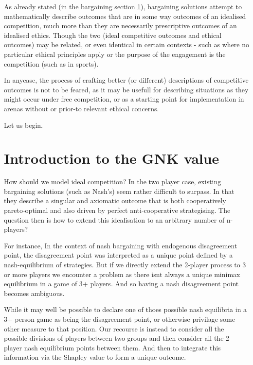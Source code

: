 As already stated (in the bargaining section \ref{}), bargaining solutions attempt to mathematically describe outcomes that are in some way outcomes of an idealised competition, much more than they are necessarily prescriptive outcomes of an idealised ethics.
Though the two (ideal competitive outcomes and ethical outcomes) may be related, or even identical in certain contexts - such as where no particular ethical principles apply or the purpose of the engagement is the competition (such as in sports).

In anycase, the process of crafting better (or different) descriptions of competitive outcomes is not to be feared, as it may be usefull for describing situations as they might occur under free competition, or as a starting point for implementation in arenas without or prior-to relevant ethical concerns.

Let us begin.

\section{Introduction to the GNK value}

How should we model ideal competition? In the two player case, existing bargaining solutions (such as Nash's) seem rather difficult to surpass. In that they describe a singular and axiomatic outcome that is both cooperatively pareto-optimal and also driven by perfect anti-cooperative strategising.
The question then is how to extend this idealisation to an arbitrary number of n-players?

For instance, In the context of nash bargaining with endogenous disagreement point, the disagreement point was interpreted as a unique point defined by a nash-equilibrium of strategies.
But if we directly extend the 2-player process to 3 or more players we encounter a problem as there isnt always a unique minimax equilibrium in a game of 3+ players.
And so having a nash disagreement point becomes ambiguous.

While it may well be possible to declare one of thoes possible nash equilibria in a 3+ person game as being the disagreement point, or otherwise privilage some other measure to that position.
Our recourse is instead to consider all the possible divisions of players between two groups and then consider all the 2-player nash equilibrium points between them. And then to integrate this information via the Shapley value to form a unique outcome.


